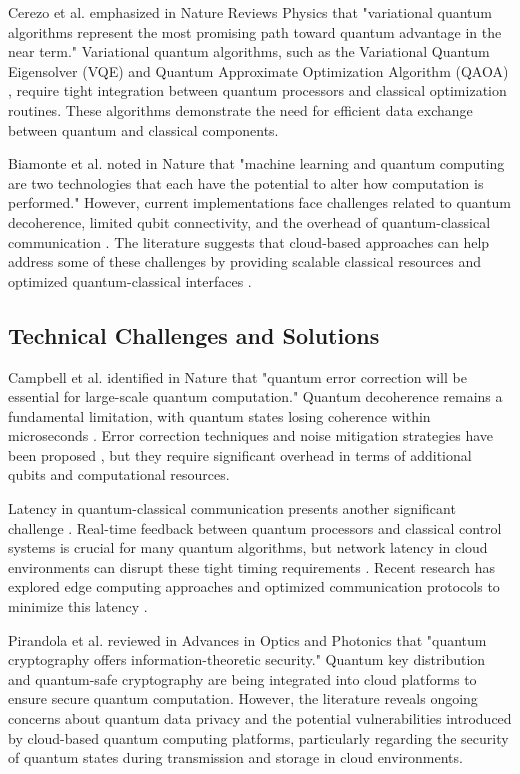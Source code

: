 \documentclass[onecolumn]{IEEEtran}
\begin{document}
Cerezo et al. \cite{cerezo2021} emphasized in Nature Reviews Physics that "variational quantum algorithms represent the most promising path toward quantum advantage in the near term." Variational quantum algorithms, such as the Variational Quantum Eigensolver (VQE) and Quantum Approximate Optimization Algorithm (QAOA) \cite{hybrid_algorithms}, require tight integration between quantum processors and classical optimization routines. These algorithms demonstrate the need for efficient data exchange between quantum and classical components.

Biamonte et al. \cite{quantum_ml} noted in Nature that "machine learning and quantum computing are two technologies that each have the potential to alter how computation is performed." However, current implementations face challenges related to quantum decoherence, limited qubit connectivity, and the overhead of quantum-classical communication \cite{preskill2018}. The literature suggests that cloud-based approaches can help address some of these challenges by providing scalable classical resources and optimized quantum-classical interfaces \cite{bharti2022}.

\subsection{Technical Challenges and Solutions}

Campbell et al. \cite{quantum_error} identified in Nature that "quantum error correction will be essential for large-scale quantum computation." Quantum decoherence remains a fundamental limitation, with quantum states losing coherence within microseconds \cite{preskill2018}. Error correction techniques and noise mitigation strategies have been proposed \cite{endo2021}, but they require significant overhead in terms of additional qubits and computational resources.

Latency in quantum-classical communication presents another significant challenge \cite{hybrid_algorithms}. Real-time feedback between quantum processors and classical control systems is crucial for many quantum algorithms, but network latency in cloud environments can disrupt these tight timing requirements \cite{cerezo2021}. Recent research has explored edge computing approaches and optimized communication protocols to minimize this latency \cite{endo2021}.

Pirandola et al. \cite{quantum_security} reviewed in Advances in Optics and Photonics that "quantum cryptography offers information-theoretic security." Quantum key distribution and quantum-safe cryptography are being integrated into cloud platforms to ensure secure quantum computation. However, the literature reveals ongoing concerns about quantum data privacy and the potential vulnerabilities introduced by cloud-based quantum computing platforms, particularly regarding the security of quantum states during transmission and storage in cloud environments.
\end{document}
